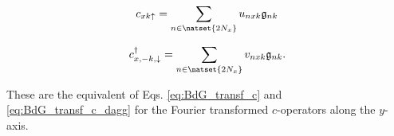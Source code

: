 \documentclass[../main.tex]{subfile}
\begin{document}
\begin{center}
    \begin{minipage}{0.4\textwidth}
    \begin{equation}\label{eq:BdG_transf_c_fourier}
        c_{xk\uparrow} = \sum_{n\in\natset{2N_x}} u_{nxk}\mathfrak{g}_{nk} 
    \end{equation}
    \end{minipage}\hspace{0.05\textwidth}
    \begin{minipage}{0.03\textwidth}
    \end{minipage}
    \begin{minipage}{0.45\textwidth}
        \begin{equation}
        \label{eq:BdG_transf_c_fourier_dagg}
            c_{x,-k,\downarrow}^{\dagger} =\sum_{n\in\natset{2N_x}} v_{nxk}\mathfrak{g}_{nk}. 
        \end{equation}
    \end{minipage}
    \end{center}
These are the equivalent of Eqs. \ref{eq:BdG_transf_c} and \ref{eq:BdG_transf_c_dagg} for the Fourier transformed $c$-operators along the $y$-axis.\\
\end{document}

